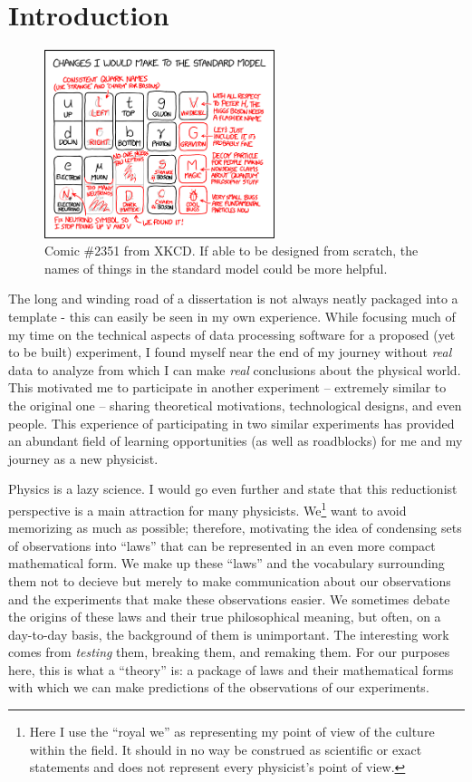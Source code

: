 \chapter{Introduction}
\label{chapter:intro}

\begin{figure}[h]
  \centering
  \includegraphics[width=0.6\textwidth]{figures/standard_model_changes-xkcd-2351.png}
  \caption{Comic \#2351 from XKCD\cite{xkcd}.
  If able to be designed from scratch, the names of things in the standard model could be
  more helpful.}
\end{figure}

The long and winding road of a dissertation is not always neatly packaged into a template - this
can easily be seen in my own experience. While focusing much of my time on the technical aspects of
data processing software for a proposed (yet to be built) experiment, I found myself near the end
of my journey without \emph{real} data to analyze from which I can make \emph{real} conclusions
about the physical world. This motivated me to participate in another experiment -- extremely
similar to the original one -- sharing theoretical motivations, technological designs, and even
people. This experience of participating in two similar experiments has provided an abundant field
of learning opportunities (as well as roadblocks) for me and my journey as a new physicist.

Physics is a lazy science. I would go even further and state that this reductionist perspective is
a main attraction for many physicists. We\footnote{Here I use the ``royal we'' as representing my
  point of view of the culture within the field. It should in no way be construed as scientific or
  exact statements and does not represent every physicist's point of view.} want to avoid memorizing
as much as possible; therefore, motivating the idea of condensing sets of observations into
``laws'' that can be represented in an even more compact mathematical form. We make up these
``laws'' and the vocabulary surrounding them not to decieve but merely to make communication about
our observations and the experiments that make these observations easier. We sometimes debate the
origins of these laws and their true philosophical meaning, but often, on a day-to-day basis, the
background of them is unimportant. The interesting work comes from \emph{testing} them, breaking
them, and remaking them. For our purposes here, this is what a ``theory'' is: a package of laws and
their mathematical forms with which we can make predictions of the observations of our experiments.

